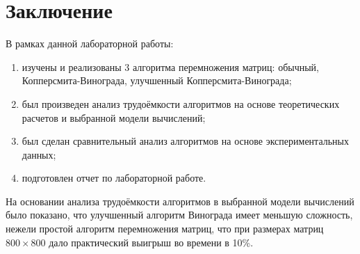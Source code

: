 \chapter*{Заключение}

В рамках данной лабораторной работы:
\begin{enumerate}
	\item изучены и реализованы 3 алгоритма перемножения матриц: обычный, Копперсмита-Винограда, улучшенный Копперсмита-Винограда;
	\item был произведен анализ трудоёмкости алгоритмов на основе теоретических расчетов и выбранной модели вычислений;
	\item был сделан сравнительный анализ алгоритмов на основе экспериментальных данных;
    \item подготовлен отчет по лабораторной работе.
\end{enumerate}

На основании анализа трудоёмкости алгоритмов в выбранной модели вычислений было показано, что улучшенный алгоритм Винограда имеет меньшую сложность, нежели простой алгоритм перемножения матриц, что при размерах матриц $800 \times 800$ дало практический выигрыш во времени в 10\%.
